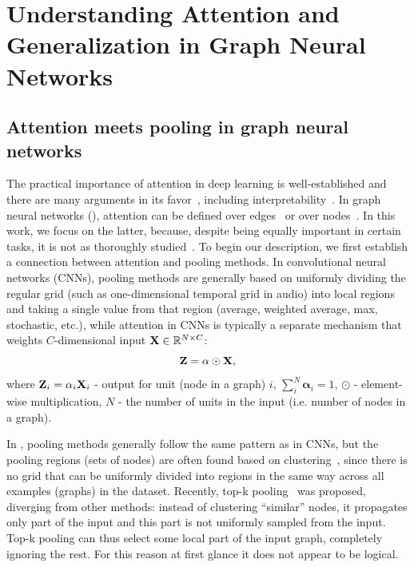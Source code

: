 \graphicspath{{Ch3_2019_neurips/figs/}}

\chapter{{Understanding Attention and Generalization in Graph Neural Networks}\label{ch:neurips2019}}



\section{Attention meets pooling in graph neural networks}\label{sec:attn_intro}

The practical importance of attention in deep learning is well-established and there are many arguments in its favor~\citep{vaswani2017attention}, including interpretability~\citep{park2016attentive, deac2018attentive}.
In graph neural networks (\gnns), attention can be defined over edges~\citep{velickovic2017graph, zhang2018gaan} or over nodes~\citep{lee2018graph}. In this work, we focus on the latter, because, despite being equally important in certain tasks, it is not as thoroughly studied~\citep{lee2018attention}. To begin our description, we first establish a connection between attention and pooling methods.
In convolutional neural networks (CNNs), pooling methods are generally based on uniformly dividing the regular grid (such as one-dimensional temporal grid in audio) into local regions and taking a single value from that region (average, weighted average, max, stochastic, etc.), while attention in CNNs is typically a separate mechanism that weights $C$-dimensional input $\mathbf{X} \in \mathbb{R}^{N \times C}$:
%
\begin{equation}
\label{eq:attn}
\mathbf{Z} = \mathbf{\alpha} \odot \mathbf{X},
\end{equation}
%
\noindent where $\mathbf{Z}_i = \mathbf{\alpha}_i \mathbf{X}_i$ - output for unit (node in a graph) $i$, $\sum_i^N \mathbf{\alpha}_i = 1$, $\odot$ - element-wise multiplication, $N$ - the number of units in the input (i.e. number of nodes in a graph).

In \gnns, pooling methods generally follow the same pattern as in CNNs, but the pooling regions (sets of nodes) are often found based on clustering~\citep{defferrard2016convolutional, shaham2018spectralnet, ying2018hierarchical}, since there is no grid that can be uniformly divided into regions in the same way across all examples (graphs) in the dataset.
Recently, top-k pooling~\citep{graphunet2018} was proposed, diverging from other methods: instead of clustering ``similar'' nodes, it propagates only part of the input and this part is not uniformly sampled from the input. Top-k pooling can thus select some local part of the input graph, completely ignoring the rest. For this reason at first glance it does not appear to be logical.


